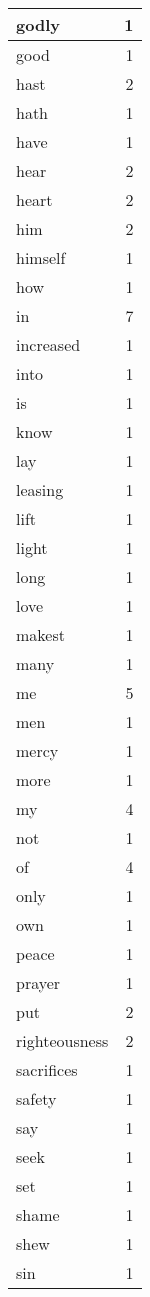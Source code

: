 \begin{center}
\begin{longtable}{l|r}
godly & 1 \\ \hline
good & 1 \\ \hline
hast & 2 \\ \hline
hath & 1 \\ \hline
have & 1 \\ \hline
hear & 2 \\ \hline
heart & 2 \\ \hline
him & 2 \\ \hline
himself & 1 \\ \hline
how & 1 \\ \hline
in & 7 \\ \hline
increased & 1 \\ \hline
into & 1 \\ \hline
is & 1 \\ \hline
know & 1 \\ \hline
lay & 1 \\ \hline
leasing & 1 \\ \hline
lift & 1 \\ \hline
light & 1 \\ \hline
long & 1 \\ \hline
love & 1 \\ \hline
makest & 1 \\ \hline
many & 1 \\ \hline
me & 5 \\ \hline
men & 1 \\ \hline
mercy & 1 \\ \hline
more & 1 \\ \hline
my & 4 \\ \hline
not & 1 \\ \hline
of & 4 \\ \hline
only & 1 \\ \hline
own & 1 \\ \hline
peace & 1 \\ \hline
prayer & 1 \\ \hline
put & 2 \\ \hline
righteousness & 2 \\ \hline
sacrifices & 1 \\ \hline
safety & 1 \\ \hline
say & 1 \\ \hline
seek & 1 \\ \hline
set & 1 \\ \hline
shame & 1 \\ \hline
shew & 1 \\ \hline
sin & 1 \\ \hline

\end{longtable}
\end{center}
